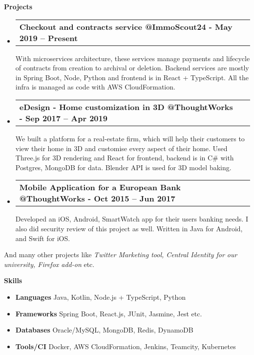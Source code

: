 \documentclass[letterpaper,12pt]{article}[leftmargin=*]
\makeatletter
\def \entryspacing {-0pt}
\renewcommand{\section}[2]{\vspace{5pt}
  \colorbox{secondary}{\color{white}\raggedbottom\normalsize\textbf{{#1}{\hspace{7pt}#2}}}
}
\newcommand{\resumeEntryStart}{\begin{itemize}[leftmargin=2.5mm]}
\newcommand{\resumeEntryEnd}{\end{itemize}\vspace{\entryspacing}}
\newcommand{\resumeEntryTD}[2]{
  \vspace{-1pt}\item[]
    \begin{tabularx}{0.97\textwidth}{X@{\hspace{60pt}}r}
      \textbf{\color{primary}#1} & {\firabook\color{accent}\small#2} \\
    \end{tabularx}\vspace{-6pt}
}
\newcommand{\resumeEntryS}[2]{
  \item[]\small{
    \textbf{\color{primary}#1 }{ #2 \vspace{-6pt}}
  }
}
\makeatother
\begin{document}
\section{\faFlask}{Projects}

  \resumeEntryStart
    \resumeEntryTD
      {Checkout and contracts service @ImmoScout24 {\normalfont - May 2019 -- Present}}{}
      \begin{flushleft}\small
      With microservices architecture, these services manage payments and lifecycle of contracts from creation to archival or deletion. Backend services are mostly in Spring Boot, Node, Python and frontend is in React + TypeScript. All the infra is managed as code with AWS CloudFormation.
      \end{flushleft}
  \resumeEntryEnd

  \resumeEntryStart
    \resumeEntryTD
      {eDesign - Home customization in 3D @ThoughtWorks {\normalfont - Sep 2017 -- Apr 2019}}{}
      \begin{flushleft}\small
      We built a platform for a real-estate firm, which will help their customers to view their home in 3D and customise every aspect of their home. Used Three.js for 3D rendering and React for frontend, backend is in C\# with Postgres, MongoDB for data. Blender API is used for 3D model baking.
      \end{flushleft}
  \resumeEntryEnd

  \resumeEntryStart
    \resumeEntryTD
      {Mobile Application for a European Bank @ThoughtWorks {\normalfont - Oct 2015 -- Jun 2017}}{}
    \begin{flushleft}\small
    Developed an iOS, Android, SmartWatch app for their users banking needs. I also did security review of this project as well. Written in Java for Android, and Swift for iOS.
    \end{flushleft}
  \resumeEntryEnd

  \begin{adjustwidth}{2.5mm}{2.5mm}\small
  {And many other projects like \textit{Twitter Marketing tool, Central Identity for our university, Firefox add-on} etc.}
  \end{adjustwidth}
  \vspace{4pt}

\section{\faGears}{Skills}
  \resumeEntryStart
  \resumeEntryS{Languages} {Java, Kotlin, Node.js + TypeScript, Python}
  \resumeEntryS{Frameworks} {Spring Boot, React.js, JUnit, Jasmine, Jest etc.}
  \resumeEntryS{Databases} {Oracle/MySQL, MongoDB, Redis, DynamoDB}
  \resumeEntryS{Tools/CI} {Docker, AWS CloudFormation, Jenkins, Teamcity, Kubernetes}
  \resumeEntryEnd
\end{document}
